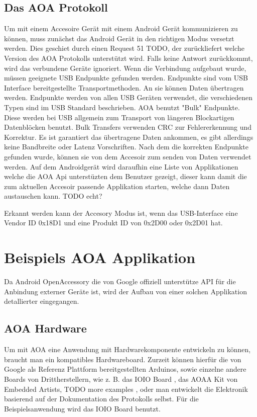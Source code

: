 \documentclass[12pt,journal,compsoc]{IEEEtran}
\begin{document}
\subsection{Das AOA Protokoll}
Um mit einem Accesoire Gerät mit einem Android Gerät kommunizieren zu können, muss zunächst das Android Gerät in den richtigen Modus versetzt werden.
Dies geschiet durch einen Request 51 TODO, der zurückliefert welche Version des AOA Protokolls unterstützt wird. Falls keine Antwort zurückkommt, wird das verbundene Geräte ignoriert.
Wenn die Verbindung aufgebaut wurde, müssen geeignete USB Endpunkte gefunden werden. Endpunkte sind vom USB Interface bereitgestellte Transportmethoden. An sie können Daten übertragen werden.
Endpunkte werden von allen USB Geräten verwendet, die verschiedenen Typen sind im USB Standard beschrieben.
AOA benutzt "Bulk" Endpunkte. Diese werden bei USB allgemein zum Transport von längeren Blockartigen Datenblöcken benutzt.
Bulk Transfers verwenden CRC zur Fehlererkennung und Korrektur. Es ist garantiert das übertragene Daten ankommen, es gibt allerdings keine Bandbreite oder Latenz Vorschriften.
\cite{usbbulk}
Nach dem die korrekten Endpunkte gefunden wurde, können sie von dem Accesoir zum senden von Daten verwendet werden.
Auf dem Androidgerät wird daraufhin eine Liste von Applikationen welche die AOA Api unterstüzten dem Benutzer gezeigt, dieser kann damit die zum aktuellen Accesoir passende Applikation starten, welche dann Daten austauschen kann. TODO echt?


Erkannt werden kann der Accesory Modus ist, wenn das USB-Interface eine Vendor ID 0x18D1 und eine Produkt ID von 0x2D00 oder 0x2D01 hat. 

\section{Beispiels AOA Applikation}
Da Android OpenAccessory die von Google offiziell unterstütze API für die Anbindung externer Geräte ist, wird der Aufbau von einer solchen Applikation detallierter eingegangen.
\subsection{AOA Hardware}
Um mit AOA eine Anwendung mit Hardwarekomponente entwickeln zu können, braucht man ein kompatibles Hardwareboard.
Zurzeit können hierfür die von Google als Referenz Plattform bereitgestellten Arduinos, sowie einzelne andere Boards von Drittherstellern, wie z. B. das IOIO Board \cite{ioio}, das AOAA Kit von Embedded Artists\cite{aoaa},  TODO more examples , oder man entwickelt die Elektronik basierend auf der Dokumentation des Protokolls selbst\cite{aoaprotocol2}.
Für die Beispielsanwendung wird das IOIO Board benutzt.
\end{document}
